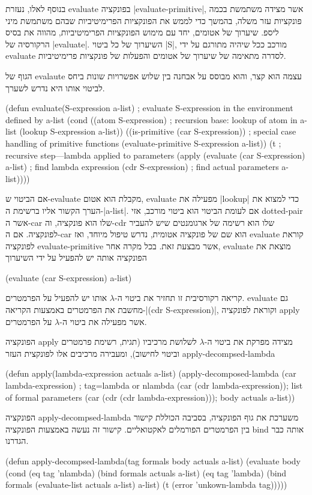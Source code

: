 בנוסף לאלו, נעזרת evaluate בפונקציה \E|evaluate-primitive|, אשר מצידה משתמשת
בכמה פונקציות עזר משלה, בהמשך כדי לממש את הפונקציות הפרימיטיביות שבהם משתמשת
מיני ליספ. שיערוך של אטומים, יחד עם מימוש הפונקציות הפרימיטיביות, מהווה את
בסיס הרקורסיה של \E|evaluate|. השיערוך של כל ביטוי \E|S|, מורכב ככל שיהיה
מתורגם על ידי evaluate לסדרה מתאימה של שיערוך של אטומים והפעלות של פונקציות
פרימיטיביות.

הגוף של evalaute עצמה הוא קצר, והוא מבוסס על אבחנה בין שלוש אפשרויות שונות ביחס
לביטוי אותו היא נדרש לשערך.

\minipage\textwidth
\begin{KERNEL}
(defun evaluate(S-expression a-list) ; evaluate S-expression in the environment defined by a-list
  (cond ((atom S-expression) ; recursion base: lookup of atom in a-list
          (lookup S-expression a-list))
        ((is-primitive (car S-expression)) ; special case handling of primitive functions
          (evaluate-primitive S-expression a-list))
        (t ; recursive step---lambda applied to parameters
          (apply (evaluate (car S-expression) a-list) ; find lambda expression
                  (cdr S-expression) ; find actual parameters
                  a-list))))
\end{KERNEL}
\endminipage

אם הביטוי ש-evaluate מקבלת הוא אטום, evaluate מפעילה את \E|lookup| כדי למצוא את
הערך הקשור אליו ברשימת ה-\E|a-list|. אם לעומת הביטוי הוא ביטוי מורכב, אזי
dotted-pair אשר ה-car שלו הוא פונקציה, וה-cdr שלו הוא רשימה של
ארגומנטים שיש להעביר לפונקציה. אם ה-car הוא שם של פונקציה אטומית, נדרש טיפול
מיוחד, ואז evaluate קוראת לפונקציה evaluate-primitive אשר מבצעת זאת.
בכל מקרה אחר, evaluate מוצאת את הפונקציה אותה יש להפעיל על ידי השיערוך
\begin{LISP}
(evaluate (car S-expression) a-list)
\end{LISP}
קריאה רקורסיבית זו תחזיר את ביטוי ה-$λ$ אותו יש להפעיל על הפרמטרים. evaluate
גם מחשבת את הפרמטרים באמצעות הקריאה-\T|(cdr S-expression)|, וקוראת לפונקציה
apply אשר מפעילה את ביטוי ה-$λ$ על הפרמטרים.

הפונקציה apply מצידה מפרקת את ביטוי ה-$λ$ לשלושת מרכיביו (תגית, רשימת פרמטרים
וביטוי לחישוב), ומעבירה מרכיבים אלו לפונקצית העזר apply-decompsed-lambda
\begin{KERNEL}
(defun apply(lambda-expression actuals a-list)
  (apply-decomposed-lambda
    (car lambda-expression) ; tag=lambda or nlambda
    (car (cdr lambda-expression)); list of formal parameters
    (car (cdr (cdr lambda-expression))); body
    actuals
    a-list))
\end{KERNEL}
הפונקציה apply-decompsed-lambda משערכת את גוף הפונקציה, בסביבה הכוללת קישור בין
הפרמטרים הפורמלים לאקטואליים. קישור זה נעשה באמצעות הפונקציה bind אותה כבר
הגדרנו.
\begin{KERNEL}
(defun apply-decompsed-lambda(tag formals body actuals a-list)
  (evaluate body
    (cond (eq tag 'nlambda) (bind formals actuals a-list)
          (eq tag 'lambda) (bind formals (evaluate-list actuals a-list) a-list)
          (t (error 'unkown-lambda tag)))))
\end{KERNEL}

